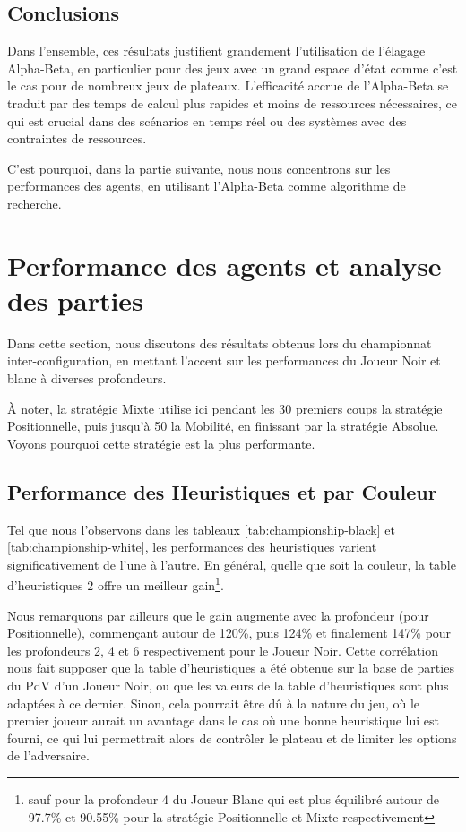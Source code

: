 \subsection*{Conclusions}

Dans l'ensemble, ces résultats justifient grandement l'utilisation de l'élagage Alpha-Beta, en particulier pour des jeux avec un grand espace d'état comme c'est le cas pour de nombreux jeux de plateaux. L'efficacité accrue de l'Alpha-Beta se traduit par des temps de calcul plus rapides et moins de ressources nécessaires, ce qui est crucial dans des scénarios en temps réel ou des systèmes avec des contraintes de ressources.

C'est pourquoi, dans la partie suivante, nous nous concentrons sur les performances des agents, en utilisant l'Alpha-Beta comme algorithme de recherche.

\pagebreak
\section{Performance des agents et analyse des parties}

Dans cette section, nous discutons des résultats obtenus lors du championnat inter-configuration, en mettant l'accent sur les performances du Joueur Noir et blanc à diverses profondeurs. 

À noter, la stratégie Mixte utilise ici pendant les 30 premiers coups la stratégie Positionnelle, puis jusqu'à 50 la Mobilité, en finissant par la stratégie Absolue. Voyons pourquoi cette stratégie est la plus performante.

\subsection{Performance des Heuristiques et par Couleur}
Tel que nous l'observons dans les tableaux \ref{tab:championship-black} et \ref{tab:championship-white}, les performances des heuristiques varient significativement de l'une à l'autre. En général, quelle que soit la couleur, la table d'heuristiques 2 offre un meilleur gain\footnote{sauf pour la profondeur 4 du Joueur Blanc qui est plus équilibré autour de 97.7\% et 90.55\% pour la stratégie Positionnelle et Mixte respectivement}. 

Nous remarquons par ailleurs que le gain augmente avec la profondeur (pour Positionnelle), commençant autour de 120\%, puis 124\% et finalement 147\% pour les profondeurs 2, 4 et 6 respectivement pour le Joueur Noir. Cette corrélation nous fait supposer que la table d'heuristiques a été obtenue sur la base de parties du \ac{PdV} d'un Joueur Noir, ou que les valeurs de la table d'heuristiques sont plus adaptées à ce dernier. Sinon, cela pourrait être dû à la nature du jeu, où le premier joueur aurait un avantage dans le cas où une bonne heuristique lui est fourni, ce qui lui permettrait alors de contrôler le plateau et de limiter les options de l'adversaire.

